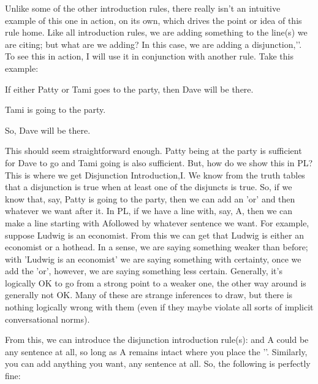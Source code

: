 Unlike some of the other introduction rules, there really isn't an intuitive example of this one in action, on its own, which drives the point or idea of this rule home. Like all introduction rules, we are adding something to the line(s) we are citing; but what are we adding? In this case, we are adding a disjunction,'\eor '. To see this in action, I will use it in conjunction with another rule. Take this example:
\begin{earg}
\item[]If either Patty or Tami goes to the party, then Dave will be there.
\item[]Tami is going to the party.
\item[]So, Dave will be there.
\end{earg}
This should seem straightforward enough. Patty being at the party is sufficient for Dave to go and Tami going is also sufficient. But, how do we show this in PL? This is where we get Disjunction Introduction,\eor I. We know from the truth tables that a disjunction is true when at least one of the disjuncts is true. So, if we know that, say, Patty is going to the party, then we can add an 'or' and then whatever we want after it. In PL, if we have a line with, say, A, then we can make a line starting with A\eor  followed by whatever sentence we want. For example, suppose Ludwig is an economist. From this we can get that Ludwig is either an economist or a hothead. In a sense, we are saying something weaker than before; with 'Ludwig is an economist' we are saying something with certainty, once we add the 'or', however, we are saying something less certain. Generally, it's logically OK to go from a strong point to a weaker one, the other way around is generally not OK. Many of these are strange inferences to draw, but there is nothing logically wrong with them (even if they maybe violate all sorts of implicit conversational norms).

From this, we can introduce the disjunction introduction rule(s):
and
A could be any sentence at all, so long as A remains intact where you place the '\eor '. Similarly, you can add anything you want, any sentence at all. So, the following is perfectly fine:
\begin{fitchproof}
     \have[2]{ab}{M\eor ([(A\eiff B)\eif (C\eand D)\eiff [E\eand F])} 
\end{fitchproof}

